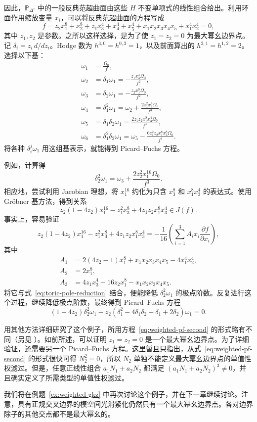 \begin{example}
因此，$\mathbb P_{\Delta^\circ}$ 中的一般反典范超曲面由这些 $H$ 不变单项式的线性组合给出。利用环面作用缩放变量 $x_i$，可以将反典范超曲面的方程写成
\begin{equation}\label{eq:weighted-pf-family}
f=z_2x_1^8+x_2^8+z_1x_3^4+x_4^4+x_5^4
+x_1x_2x_3x_4x_5+x_1^4x_2^4=0,
\end{equation}
其中 $z_1,z_2$ 是参数。之所以这样选择，是为了使 $z_1=z_2=0$ 为最大幂幺边界点。记 $\delta_i=z_i\,d/dz_i$。Hodge 数为
$h^{3,0}=h^{0,3}=1$，以及前面算出的 $h^{2,1}=h^{1,2}=2$。选择以下基：
\[
\begin{aligned}
\omega_1&=\frac{\Omega_0}{f},\\
\omega_2&=\delta_1\omega_1=-\frac{z_1x_3^4\Omega_0}{f^2},\\
\omega_3&=\delta_2\omega_1=-\frac{z_2x_1^8\Omega_0}{f^2},\\
\omega_4&=\delta_1^2\omega_1=\omega_2+\frac{2z_1^2x_3^8\Omega_0}{f^3},\\
\omega_5&=\delta_1\delta_2\omega_1=\frac{2z_1z_2x_1^8x_3^4\Omega_0}{f^3},\\
\omega_6&=\delta_1^2\delta_2\omega_1
=\omega_5-\frac{6z_1^2z_2x_1^8x_3^8\Omega_0}{f^4}.
\end{aligned}
\]
将各种 $\delta_i^j\omega_1$ 用这组基表示，就能得到 Picard--Fuchs 方程。

例如，计算得
\[
\delta_2^2\omega_1=\omega_3+\frac{2z_2^2x_1^{16}\Omega_0}{f^3}.
\]
相应地，尝试利用 Jacobian 理想，将 $x_1^{16}$ 约化为只含 $x_3^8$ 和 $x_1^8x_3^4$ 的表达式。使用 Gröbner 基方法，得到关系
\[
z_2(1-4z_2)x_1^{16}-z_1^2x_3^8+4z_1z_2x_1^8x_3^4\in J(f).
\]
事实上，容易验证
\[
z_2(1-4z_2)x_1^{16}-z_1^2x_3^8+4z_1z_2x_1^8x_3^4
=-\frac1{16}\left(\sum_{i=1}^3A_ix_i\frac{\partial f}{\partial x_i}\right),
\]
其中
\[
\begin{aligned}
A_1&=2(4z_2-1)x_1^8+x_1x_2x_3x_4x_5-4x_1^4x_2^4,\\
A_2&=2x_1^8,\\
A_3&=4z_1x_3^4-16z_2x_1^8-x_1x_2x_3x_4x_5.
\end{aligned}
\]
将它与式~\eqref{eq:toric-pole-reduction} 结合，便能降低 $\delta_2^2\omega_1$ 的极点阶数。反复进行这个过程，继续降低极点阶数，最终得到 Picard--Fuchs 方程
\begin{equation}\label{eq:weighted-pf-second}
(1-4z_2)\delta_2^2\omega_1
-z_2(\delta_1^2-4\delta_1\delta_2-\delta_1+2\delta_2)\omega_1=0.
\end{equation}

 用其他方法详细研究了这个例子，所用方程~\eqref{eq:weighted-pf-second} 的形式略有不同（另见 ）。如前所述，可以证明 $z_1=z_2=0$ 是一个最大幂幺边界点。为了详细验证，还需要另一个 Picard--Fuchs 方程。这里暂且只指出，从式~\eqref{eq:weighted-pf-second} 的形式很快可得 $N_2^2=0$，所以 $N_2$ 单独不能定义最大幂幺边界点的单值性权滤过。但是，任意正线性组合 $a_1N_1+a_2N_2$ 都满足
$(a_1N_1+a_2N_2)^3\ne0$，并且确实定义了所需类型的单值性权滤过。

我们将在例题~\ref{ex:weighted-gkz} 中再次讨论这个例子，并在下一章继续讨论。注意，具有正规交叉边界的模空间光滑紧化仍然只有一个最大幂幺边界点。各对边界除子的其他交点都不是最大幂幺的。
\end{example}


